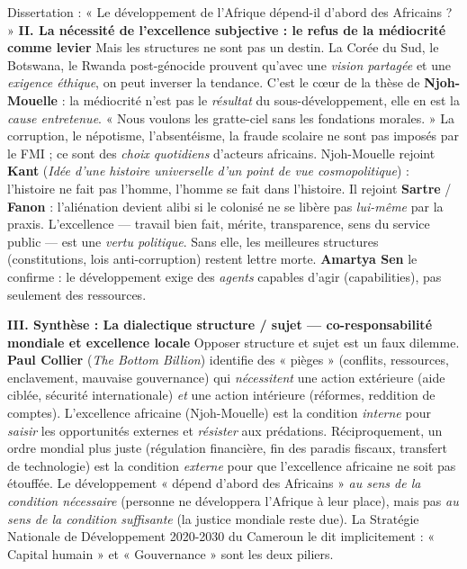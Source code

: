 \documentclass[11pt]{article}
\newcommand{\cle}[1]{{\popxbold\color{popdark}#1}}
\begin{document}
\begin{exoresolu}{Dissertation : « Le développement de l'Afrique dépend-il d'abord des Africains ? »}
\textbf{II. La nécessité de l'excellence subjective : le refus de la médiocrité comme levier}
Mais les structures ne sont pas un destin. La Corée du Sud, le Botswana, le Rwanda post-génocide prouvent qu'avec une \emph{vision partagée} et une \emph{exigence éthique}, on peut inverser la tendance. C'est le cœur de la thèse de \textbf{Njoh-Mouelle} : la médiocrité n'est pas le \emph{résultat} du sous-développement, elle en est la \emph{cause entretenue}. « Nous voulons les gratte-ciel sans les fondations morales. » La corruption, le népotisme, l'absentéisme, la fraude scolaire ne sont pas imposés par le FMI ; ce sont des \emph{choix quotidiens} d'acteurs africains. Njoh-Mouelle rejoint \textbf{Kant} (\emph{Idée d'une histoire universelle d'un point de vue cosmopolitique}) : l'histoire ne fait pas l'homme, l'homme se fait dans l'histoire. Il rejoint \textbf{Sartre} / \textbf{Fanon} : l'aliénation devient alibi si le colonisé ne se libère pas \emph{lui-même} par la praxis. L'excellence — travail bien fait, mérite, transparence, sens du service public — est une \emph{vertu politique}. Sans elle, les meilleures structures (constitutions, lois anti-corruption) restent lettre morte. \textbf{Amartya Sen} le confirme : le développement exige des \emph{agents} capables d'agir (capabilities), pas seulement des ressources.

\textbf{III. Synthèse : La dialectique structure / sujet — co-responsabilité mondiale et excellence locale}
Opposer structure et sujet est un faux dilemme. \textbf{Paul Collier} (\emph{The Bottom Billion}) identifie des « pièges » (conflits, ressources, enclavement, mauvaise gouvernance) qui \emph{nécessitent} une action extérieure (aide ciblée, sécurité internationale) \emph{et} une action intérieure (réformes, reddition de comptes). L'excellence africaine (Njoh-Mouelle) est la condition \emph{interne} pour \emph{saisir} les opportunités externes et \emph{résister} aux prédations. Réciproquement, un ordre mondial plus juste (régulation financière, fin des paradis fiscaux, transfert de technologie) est la condition \emph{externe} pour que l'excellence africaine ne soit pas étouffée. Le développement « dépend d'abord des Africains » \emph{au sens de la condition nécessaire} (personne ne développera l'Afrique à leur place), mais pas \emph{au sens de la condition suffisante} (la justice mondiale reste due). La \cle{Stratégie Nationale de Développement 2020-2030} du Cameroun le dit implicitement : « Capital humain » et « Gouvernance » sont les deux piliers.


\end{exoresolu}
\end{document}

